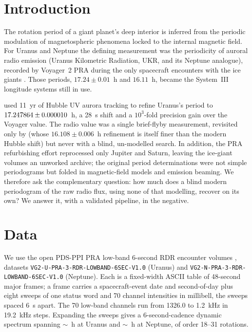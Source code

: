 \documentclass[twocolumn]{aastex631}
\newcommand{\code}[1]{\texttt{#1}}
\begin{document}

\section{Introduction}
The rotation period of a giant planet's deep interior is inferred from the periodic modulation of
magnetospheric phenomena locked to the internal magnetic field. For Uranus and Neptune the defining
measurement was the periodicity of auroral radio emission (Uranus Kilometric Radiation, UKR, and
its Neptune analogue), recorded by Voyager~2 PRA during the only spacecraft encounters with the ice
giants \citep{warwick1986,warwick1989}. Those periods, $17.24\pm0.01$~h and $16.11$~h, became the
System~III longitude systems still in use.

\citet{lamy2025} used 11~yr of Hubble UV aurora tracking to refine Uranus's period to
$17.247864\pm0.000010$~h, a 28~s shift and a $10^3$-fold precision gain over the Voyager value.
The radio value was a single brief-flyby measurement, revisited only by \citet{lecacheux1993}
(whose $16.108\pm0.006$~h refinement is itself finer than the modern Hubble shift) but never with a
blind, un-modelled search. In addition, the PRA refurbishing effort \citep{cecconi2017} reprocessed
only Jupiter and Saturn, leaving the ice-giant volumes an unworked archive; the original period
determinations were not simple periodograms but folded in magnetic-field models and emission
beaming. We therefore ask the complementary question: how much does a blind modern periodogram of
the raw radio flux, using none of that modelling, recover on its own? We answer it, with a
validated pipeline, in the negative.

\section{Data}
We use the open PDS-PPI PRA low-band 6-second RDR encounter volumes \citep{pdsppi_vg2pra}, datasets
\code{VG2-U-PRA-3-RDR-LOWBAND-6SEC-V1.0} (Uranus) and \code{VG2-N-PRA-3-RDR-LOWBAND-6SEC-V1.0}
(Neptune). Each is a fixed-width ASCII table of 48-second major frames; a frame carries a
spacecraft-event date and second-of-day plus eight sweeps of one status word and 70 channel
intensities in millibell, the sweeps spaced 6~s apart. The 70 low-band channels run from 1326.0 to
1.2~kHz in 19.2~kHz steps. Expanding the sweeps gives a 6-second-cadence dynamic spectrum spanning
$\sim$\vgRealUSpan~h at Uranus and $\sim$\vgRealNSpan~h at Neptune, of order 18--31 rotations.
\end{document}

